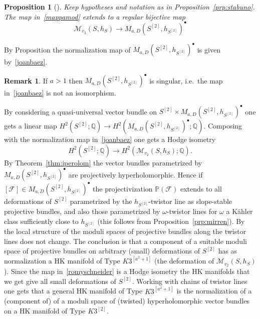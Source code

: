 \documentclass[11pt]{amsart}
\newcommand{\PP}{{\mathbb P}}
\newcommand{\QQ}{{\mathbb Q}}
\let\mathcal\mathscr
\def\cF{\mathcal{F}}
\def\cM{\mathcal{M}}
\def\lra{\longrightarrow}
\newtheorem{prp}[lmm]{Proposition}
\theoremstyle{definition}
\newtheorem{rmk}[lmm]{Remark}
\theoremstyle{remark}
\begin{document}
%
\begin{prp}[\cite{og:genhk}]\label{prp:stabdue}
% 
Keep hypotheses and notation  as in Proposition~\ref{prp:stabuno}. The map in~\eqref{mappamod} extends to a regular bijective map
%
\begin{equation}\label{joanbaez}
%
\cM_{v_2}(S,h_S) \lra  M_{a,D}(S^{[2]},h_{S^{[2]}})^{\bullet}
%
\end{equation}
%
%
\end{prp}
%
By Proposition the normalization map of $M_{a,D}(S^{[2]},h_{S^{[2]}})^{\bullet}$ is given by~\eqref{joanbaez}. 
%
\begin{rmk}
%
If $a>1$ then $M_{a,D}(S^{[2]},h_{S^{[2]}})^{\bullet}$ is singular, i.e.~the map in~\eqref{joanbaez} is not an isomorphism. 
%
\end{rmk}
%
By considering a quasi-universal vector bundle on $S^{[2]}\times M_{a,D}(S^{[2]},h_{S^{[2]}})^{\bullet}$ one gets a linear map 
$H^2(S^{[2]};\QQ)\to H^2(M_{a,D}(S^{[2]},h_{S^{[2]}})^{\bullet};\QQ)$. 
Composing with the normalization map in~\eqref{joanbaez} one gets a Hodge isometry
%
\begin{equation}\label{romyschneider}
%
H^2(S^{[2]};\QQ)\lra H^2(\cM_{v_2}(S,h_S);\QQ).
%
\end{equation}
%
By  Theorem~\ref{thm:iperolom} the vector bundles parametrized by $M_{a,D}(S^{[2]},h_{S^{[2]}})^{\bullet}$ are projectively hyperholomorphic. 
Hence if $[\cF]\in M_{a,D}(S^{[2]},h_{S^{[2]}})^{\bullet}$ the projectivization $\PP(\cF)$ extends to all deformations of $S^{[2]}$ parametrized by the $h_{S^{[2]}}$-twistor line as slope-stable projective bundles, and also those parametrized by  $\omega$-twistor lines for $\omega$ a K\"ahler class sufficiently close to $h_{S^{[2]}}$ (this follows from Proposition~\ref{prp:mirren}). By~\cite[Cor.~10.1]{verb:iperolom} the local structure of the moduli spaces of projective bundles along the twistor lines does not change. The conclusion is that a component of a suitable moduli space of projective bundles on arbitrary (small) deformations of $S^{[2]}$ has as normalization a HK manifold of Type $K3^{[a^2+1]}$ (the deformation of 
$\cM_{v_2}(S,h_S)$). Since the map in~\eqref{romyschneider} is  a Hodge isometry the HK manifolds that we get  give all small deformations
 of $S^{[2]}$. Working with chains of twistor lines one gets that a general  HK manifold of Type $K3^{[a^2+1]}$ is the normalization of a (component of) of a  moduli space of (twisted) hyperholomorphic vector bundles on a HK manifold  of Type $K3^{[2]}$.
\end{document}
